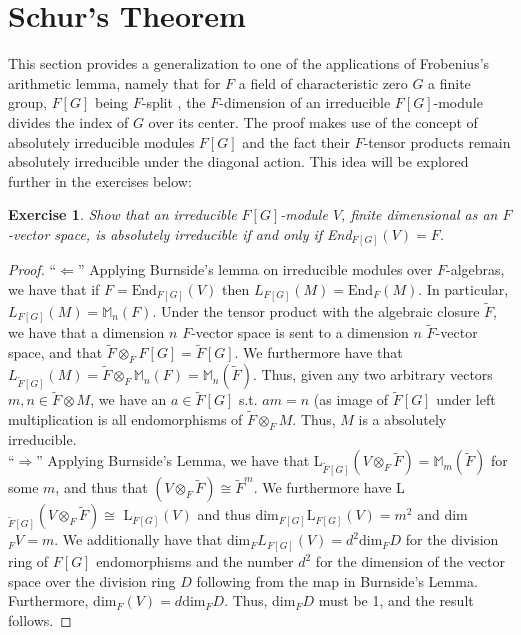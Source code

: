 \documentclass{article}
\newtheorem{exercise}{Exercise}[section]
\begin{document}
\pagebreak

\section{Schur's Theorem}

This section provides a generalization to one of the applications of Frobenius's arithmetic lemma, namely that for $F$ a field of characteristic zero $G$ a finite group, $F[G]$ being $F$-split , the $F$-dimension of an irreducible $F[G]$-module divides the index of $G$ over its center. The proof makes use of the concept of absolutely irreducible modules $F[G]$ and the fact their $F$-tensor products remain absolutely irreducible under the diagonal action. This idea will be explored further in the exercises below:

\begin{exercise}
Show that an irreducible $F[G]$-module $V$, finite dimensional as an $F$-vector
space, is absolutely irreducible if and only if End$_{F[G]}(V) = F$.
\end{exercise}

\begin{proof}
  
  ``$\Leftarrow$'' Applying Burnside's lemma on irreducible modules over $F$-algebras, we have that if $F = \text{End}_{F[G]}(V)$ then $L_{F[G]}(M) = \text{End}_{F}(M)$. In particular, $L_{F[G]}(M) = \mathbb{M}_{n}(F)$. Under the tensor product with the algebraic closure $\widetilde F$, we have that a dimension $n$ $F$-vector space is sent to a dimension $n$ $\widetilde F$-vector space, and that $\widetilde F \otimes_{F} F[G] = \widetilde F [G]$. We furthermore have that $L_{\widetilde F[G]}(M) = \widetilde F \otimes_{F} \mathbb{M}_{n}(F) =  \mathbb{M}_{n}(\widetilde F)$. Thus, given any two arbitrary vectors $m, n \in \widetilde F \otimes M$, we have an $a \in \widetilde F[G]$ s.t. $am = n$ (as image of $\widetilde F[G]$ under left multiplication is all endomorphisms of $\widetilde F \otimes_{F}M$. Thus, $M$ is a absolutely irreducible. \\ 

  
``$\Rightarrow$'' Applying Burnside's Lemma, we have that L$_{\widetilde F[G]}(V \otimes_{F}\widetilde F) = \mathbb{M}_{m}(\widetilde F)$ for some $m$, and thus that $(V \otimes_{F} \widetilde F) \cong \widetilde F^{m}$. We furthermore have L$_{\widetilde F[G]}(V \otimes_{F} \widetilde F) \cong$ L$_{F[G]}(V)$ and thus dim$_{F[G]}\text{L}_{F[G]}(V) = m^{2}$ and dim$_{F}V = m$. We additionally have that dim$_{F}L_{F[G]}(V) = d^{2}\text{dim}_{F}D$ for the division ring of $F[G]$ endomorphisms and the number $d^{2}$ for the dimension of the vector space over the division ring $D$ following from the map in Burnside's Lemma. Furthermore, dim$_{F}(V) = d \text{dim}_{F}D$. Thus, dim$_{F}D$ must be 1, and the result follows.
  \end{proof}
\pagebreak



\end{document}
